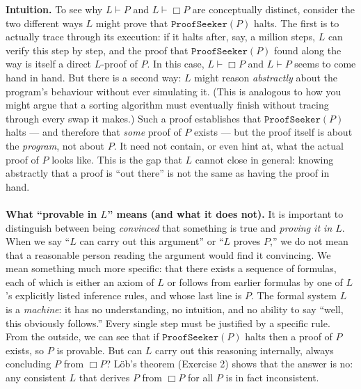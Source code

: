 \documentclass[11pt]{article}
\begin{document}
\medskip
\noindent
\textbf{Intuition.} To see why $L \vdash P$ and $L \vdash \Box P$ are conceptually
distinct, consider the two different ways $L$ might prove that
$\texttt{ProofSeeker}(P)$ halts. The first is to actually trace through its execution:
if it halts after, say, a million steps, $L$ can verify this step by step, and the proof
that $\texttt{ProofSeeker}(P)$ found along the way is itself a direct $L$-proof of $P$.
In this case, $L \vdash \Box P$ and $L \vdash P$ seems to come hand in hand. But there is a
second way: $L$ might reason \emph{abstractly} about the program's behaviour without
ever simulating it. (This is analogous to how you might argue that a sorting algorithm
must eventually finish without tracing through every swap it makes.) Such a proof
establishes that $\texttt{ProofSeeker}(P)$ halts --- and therefore that \emph{some}
proof of $P$ exists --- but the proof itself is about the \emph{program}, not about
$P$. It need not contain, or even hint at, what the actual proof of $P$ looks like.
This is the gap that $L$ cannot close in general: knowing abstractly that a proof is
``out there'' is not the same as having the proof in hand.\\\\



\medskip
\noindent
\textbf{What ``provable in $L$'' means (and what it does not).} It is
important to distinguish between being \emph{convinced} that something is true and
\emph{proving it in $L$}. When we say ``$L$ can carry out this argument'' or
``$L$ proves $P$,'' we do not mean that a reasonable person reading the argument
would find it convincing. We mean something much more specific: that there exists a
sequence of formulas, each of which is either an axiom of $L$ or follows from
earlier formulas by one of $L$'s explicitly listed inference rules, and whose last
line is $P$. The formal system $L$ is a \emph{machine}: it has no understanding, no
intuition, and no ability to say ``well, this obviously follows.'' Every single step
must be justified by a specific rule.\\

\noindent
From the outside, we can see that if $\texttt{ProofSeeker}(P)$ halts then a proof of $P$
exists, so $P$ is provable. But can $L$ carry out this reasoning internally, always concluding
$P$ from $\Box P$? L\"ob's theorem (Exercise 2) shows that the answer is no: any
consistent $L$ that derives $P$ from $\Box P$ for all $P$ is in fact inconsistent.
\end{document}

